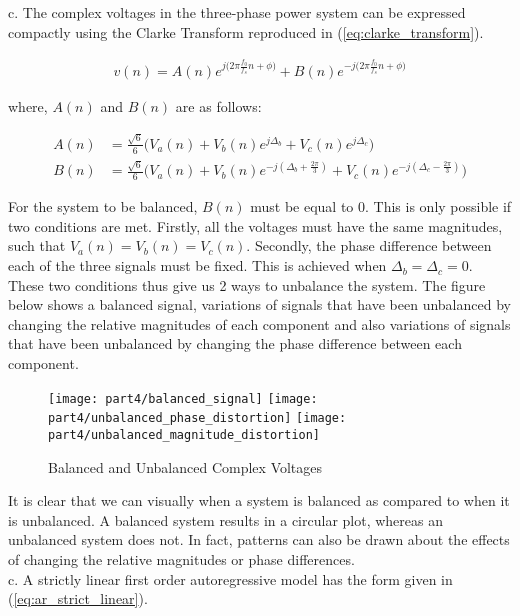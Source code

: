 \noindent{}c. The complex voltages in  the three-phase power system can be expressed compactly using the Clarke Transform reproduced in (\ref{eq:clarke_transform}).

\begin{align}
v(n) = A(n)e^{j\big(2\pi\frac{f_0}{f_s}n+\phi\big)} + B(n)e^{-j\big(2\pi\frac{f_0}{f_s}n+\phi\big)} \label{eq:clarke_transform}
\end{align}

\noindent{}where, $A(n)$ and $B(n)$ are as follows:

\begin{align*}
A(n) &= \frac{\sqrt{6}}{6}\bigg(V_a(n)+V_b(n)e^{j\Delta_b}+V_c(n)e^{j\Delta_c}\bigg) \\
B(n) &= \frac{\sqrt{6}}{6}\bigg(V_a(n)+V_b(n)e^{-j(\Delta_b + \frac{2\pi}{3})}+V_c(n)e^{-j(\Delta_c-\frac{2\pi}{3})}\bigg)
\end{align*}

\noindent{}For the system to be balanced, $B(n)$ must be equal to 0. This is only possible if two conditions are met. Firstly, all the voltages must have the same magnitudes, such that $V_a(n)=V_b(n)=V_c(n)$. Secondly, the phase difference between each of the three signals must be fixed. This is achieved when $\Delta_b=\Delta_c=0$. These two conditions thus give us 2 ways to unbalance the system. The figure below shows a balanced signal, variations of signals that have been unbalanced by changing the relative magnitudes of each component and also variations of signals that have been unbalanced by changing the phase difference between each component.  
\begin{figure}[H]
\centering{}
\texttt{[image: part4/balanced\_signal]}
\texttt{[image: part4/unbalanced\_phase\_distortion]}
\texttt{[image: part4/unbalanced\_magnitude\_distortion]}
\caption{Balanced and Unbalanced Complex Voltages}
\end{figure}

\noindent{}It is clear that we can visually when a system is balanced as compared to when it is unbalanced. A balanced system results in a circular plot, whereas an unbalanced system does not. In fact, patterns can also be drawn about the effects of changing the relative magnitudes or phase differences.\\

\noindent{}c. A strictly linear first order autoregressive model has the form given in (\ref{eq:ar_strict_linear}). 

